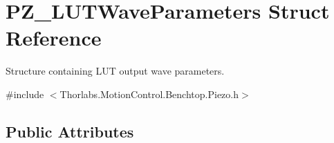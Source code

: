 \hypertarget{struct_p_z___l_u_t_wave_parameters}{}\section{P\+Z\+\_\+\+L\+U\+T\+Wave\+Parameters Struct Reference}
\label{struct_p_z___l_u_t_wave_parameters}


Structure containing L\+UT output wave parameters.  




{\ttfamily \#include $<$Thorlabs.\+Motion\+Control.\+Benchtop.\+Piezo.\+h$>$}

\subsection*{Public Attributes}
